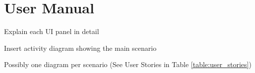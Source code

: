 \section{User Manual}
  \begin{notes}
   	\item Explain each UI panel in detail
   	\item Insert activity diagram showing the main scenario
   	\item Possibly one diagram per scenario (See User Stories in Table \ref{table:user_stories})
  \end{notes}